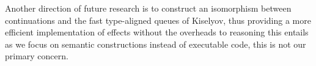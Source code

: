 \documentclass{article}
\begin{document}
Another direction of future research is to construct an isomorphism between continuations and the fast type-aligned queues of Kiselyov,
thus providing a more efficient implementation of effects without the overheads to reasoning this entails as we focus on semantic constructions instead of executable code, this is not our primary concern.
\end{document}

